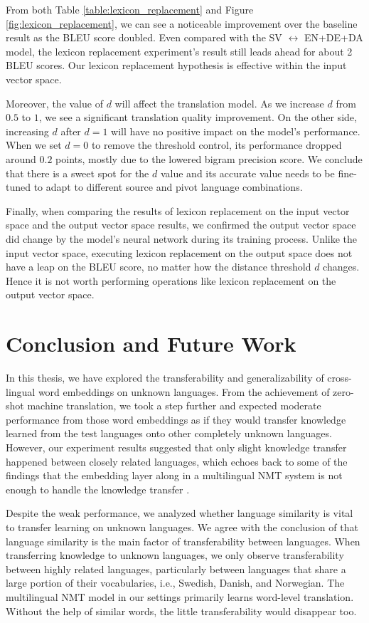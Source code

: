 \documentclass[thesis,fonts=libertine]{cluu}
\begin{document}
From both Table \ref{table:lexicon_replacement} and Figure \ref{fig:lexicon_replacement}, we can see a noticeable improvement over the baseline result as the BLEU score doubled. Even compared with the SV $\leftrightarrow$ EN+DE+DA model, the lexicon replacement experiment's result still leads ahead for about 2 BLEU scores. Our lexicon replacement hypothesis is effective within the input vector space.

Moreover, the value of $d$ will affect the translation model. As we increase $d$ from $0.5$ to $1$, we see a significant translation quality improvement. On the other side, increasing $d$ after $d=1$ will have no positive impact on the model's performance. When we set $d=0$ to remove the threshold control, its performance dropped around $0.2$ points, mostly due to the lowered bigram precision score. We conclude that there is a sweet spot for the $d$ value and its accurate value needs to be fine-tuned to adapt to different source and pivot language combinations.

Finally, when comparing the results of lexicon replacement on the input vector space and the output vector space results, we confirmed the output vector space did change by the model's neural network during its training process. Unlike the input vector space, executing lexicon replacement on the output space does not have a leap on the BLEU score, no matter how the distance threshold $d$ changes. Hence it is not worth performing operations like lexicon replacement on the output vector space.

\chapter{Conclusion and Future Work}
\label{chap:conclusion}

In this thesis, we have explored the transferability and generalizability of cross-lingual word embeddings on unknown languages. From the achievement of zero-shot machine translation, we took a step further and expected moderate performance from those word embeddings as if they would transfer knowledge learned from the test languages onto other completely unknown languages. However, our experiment results suggested that only slight knowledge transfer happened between closely related languages, which echoes back to some of the findings that the embedding layer along in a multilingual NMT system is not enough to handle the knowledge transfer \parencite{aji-etal-2020-neural}.

Despite the weak performance, we analyzed whether language similarity is vital to transfer learning on unknown languages. We agree with the conclusion of \textcite{Qi:2018aa} that language similarity is the main factor of transferability between languages. When transferring knowledge to unknown languages, we only observe transferability between highly related languages, particularly between languages that share a large portion of their vocabularies, i.e., Swedish, Danish, and Norwegian. The multilingual NMT model in our settings primarily learns word-level translation. Without the help of similar words, the little transferability would disappear too.
\end{document}
